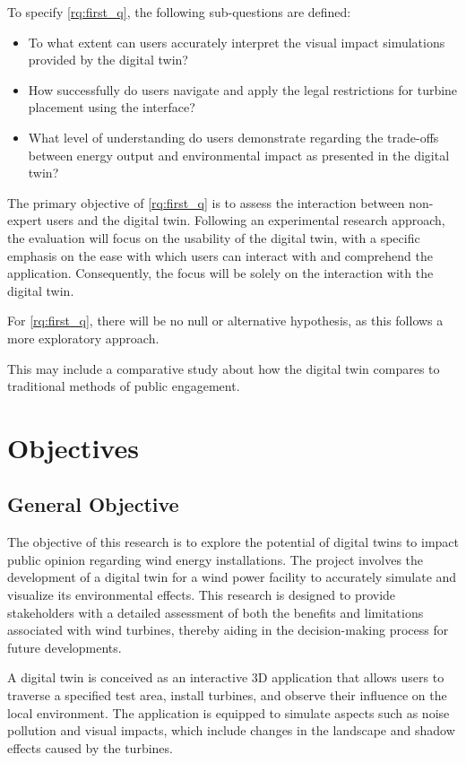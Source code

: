 \documentclass[11pt, titlepage, a4paper]{scrartcl}
\begin{document}
\begin{linenumbers}
    To specify \ref{rq:first_q}, the following sub-questions are defined:

    \begin{itemize}[label={--}]
        \item To what extent can users accurately interpret the visual impact simulations provided by the digital twin?
        \item How successfully do users navigate and apply the legal restrictions for turbine placement using the interface?
        \item What level of understanding do users demonstrate regarding the trade-offs between energy output and environmental impact as presented in the digital twin?
    \end{itemize}

    The primary objective of \ref{rq:first_q} is to assess the interaction between non-expert users and the digital twin. Following an experimental research approach, the evaluation will focus on the usability of the digital twin, with a specific emphasis on the ease with which users can interact with and comprehend the application. Consequently, the focus will be solely on the interaction with the digital twin.

    For \ref{rq:first_q}, there will be no null or alternative hypothesis, as this follows a more exploratory approach.

    This may include a comparative study about how the digital twin compares to traditional methods of public engagement.


    \section{Objectives}
    \subsection{General Objective}
    The objective of this research is to explore the potential of digital twins to impact public opinion regarding wind energy installations. The project involves the development of a digital twin for a wind power facility to accurately simulate and visualize its environmental effects. This research is designed to provide stakeholders with a detailed assessment of both the benefits and limitations associated with wind turbines, thereby aiding in the decision-making process for future developments.

    A digital twin is conceived as an interactive 3D application that allows users to traverse a specified test area, install turbines, and observe their influence on the local environment. The application is equipped to simulate aspects such as noise pollution and visual impacts, which include changes in the landscape and shadow effects caused by the turbines.


\end{linenumbers}
\end{document}

